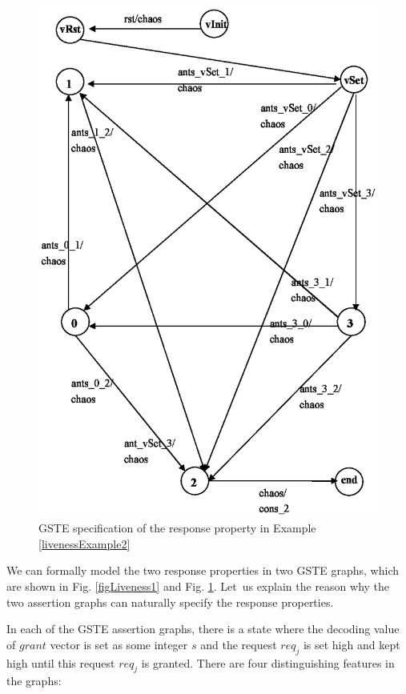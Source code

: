 \documentclass[final]{IEEEtran}
\begin{document}
\begin{figure}[tbph]
\begin{center}
\includegraphics[width=.4\textwidth]{figLiveness2.eps}
\end{center}
\caption{GSTE specification of the response property in Example
\ref{livenessExample2}} \label{figLiveness2}
\end{figure}




We can formally model the two response properties in two GSTE graphs, which are shown in Fig.
\ref{figLiveness1} and Fig. \ref{figLiveness2}. Let\  us explain  the
reason why the two assertion graphs can naturally specify the
response properties.

In each of the GSTE assertion graphs, there is a state where the decoding value of $grant$
 vector is set as  some integer $s$ and the request $req_j$ is set high and kept
high until this request
 $req_j$ is granted. There are four  distinguishing features in the graphs:
\end{document}

